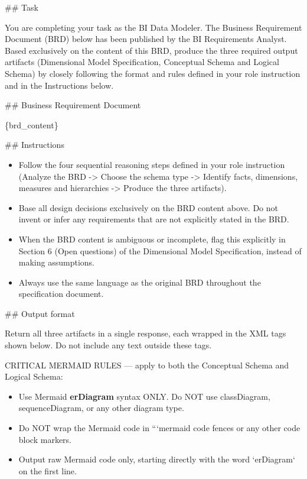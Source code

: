 \#\# Task
\newline

You are completing your task as the BI Data Modeler. The Business Requirement Document (BRD) below has been published by the BI Requirements Analyst. Based exclusively on the content of this BRD, produce the three required output artifacts (Dimensional Model Specification, Conceptual Schema and Logical Schema) by closely following the format and rules defined in your role instruction and in the Instructions below.
\newline

\#\# Business Requirement Document
\newline

\{brd\_content\}
\newline

\#\# Instructions
\begin{itemize}
    \item Follow the four sequential reasoning steps defined in your role instruction (Analyze the BRD -> Choose the schema type -> Identify facts, dimensions, measures and hierarchies -> Produce the three artifacts).
    \item Base all design decisions exclusively on the BRD content above. Do not invent or infer any requirements that are not explicitly stated in the BRD.
    \item When the BRD content is ambiguous or incomplete, flag this explicitly in Section 6 (Open questions) of the Dimensional Model Specification, instead of making assumptions.
    \item Always use the same language as the original BRD throughout the specification document.
\end{itemize}

\#\# Output format
\newline

Return all three artifacts in a single response, each wrapped in the XML tags shown below. Do not include any text outside these tags.
\newline

CRITICAL MERMAID RULES — apply to both the Conceptual Schema and Logical Schema:
\begin{itemize}
    \item Use Mermaid \textbf{erDiagram} syntax ONLY. Do NOT use classDiagram, sequenceDiagram, or any other diagram type.
    \item Do NOT wrap the Mermaid code in ```mermaid code fences or any other code block markers.
    \item Output raw Mermaid code only, starting directly with the word `erDiagram` on the first line.
\end{itemize}

